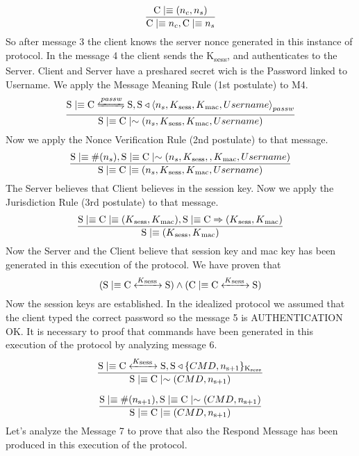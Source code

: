 \[ \frac{\textnormal{C} \mid\equiv (n_c,n_s)}{\textnormal{C} \mid\equiv n_c, \textnormal{C} \mid\equiv n_s} \]
So after message 3 the client knows the server nonce generated in this instance of protocol. In the message 4 the client sends the K\textsubscript{sess}, and authenticates to the Server. Client and Server have a preshared secret wich is the Password linked to Username. We apply the Message Meaning Rule (1st postulate) to M4.
\[ \frac{\textnormal{S} \believes \textnormal{C} \secret{passw} \textnormal{S}, \textnormal{S} \sees \combine{n_s,K\textsubscript{sess},K\textsubscript{mac},Username}{passw}}{\textnormal{S}\believes \textnormal{C} \oncesaid (n_s,K\textsubscript{sess},K\textsubscript{mac},Username)} \]
Now we apply the Nonce Verification Rule (2nd postulate) to that message.
\[ \frac{\textnormal{S}\mid\equiv \#(n_s), \textnormal{S} \mid\equiv \textnormal{C} \mid\sim (n_s,K\textsubscript{sess},,K\textsubscript{mac},Username)}
   {\textnormal{S} \mid\equiv \textnormal{C} \mid\equiv (n_s,K\textsubscript{sess},K\textsubscript{mac},Username)}	\]
The Server believes that Client believes in the session key. Now we apply the Jurisdiction Rule (3rd postulate) to that message.
\[ \frac{\textnormal{S} \mid\equiv \textnormal{C} \mid\equiv (K\textsubscript{sess},K\textsubscript{mac}), \textnormal{S} \mid\equiv \textnormal{C} \Rightarrow (K\textsubscript{sess},K\textsubscript{mac})}
        {\textnormal{S} \mid\equiv (K\textsubscript{sess},K\textsubscript{mac}) } \]
Now the Server and the Client believe that session key and mac key has been generated in this execution of the protocol. We have proven that
\[ (\textnormal{S} \mid\equiv \textnormal{C} \xleftrightarrow{K\textsubscript{sess }} \textnormal{S}) \wedge (\textnormal{C} \mid\equiv \textnormal{C} \xleftrightarrow{K\textsubscript{sess }} \textnormal{S}) \]
Now the session keys are established. In the idealized protocol we assumed that the client typed the correct password so the message 5 is AUTHENTICATION OK. It is necessary to proof that commands have been generated in this execution of the protocol by analyzing message 6.
\[ \frac{\textnormal{S} \mid\equiv \textnormal{C} \xleftrightarrow{K\textsubscript{sess }} \textnormal{S}, \textnormal{S} \triangleleft \lbrace CMD, n\textsubscript{s+1} \rbrace \textsubscript{K\textsubscript{sess}} }{ \textnormal{S} \mid\equiv \textnormal{C} \mid\sim (CMD,n\textsubscript{s+1}) }\]

\[ \frac{ \textnormal{S} \mid\equiv \#(n\textsubscript{s+1}), \textnormal{S} \mid\equiv \textnormal{C} \mid\sim (CMD,n\textsubscript{s+1}) } 
        {\textnormal{S} \mid\equiv \textnormal{C} \mid\equiv (CMD,n\textsubscript{s+1})}\]
Let's analyze the Message 7 to prove that also the Respond Message has been produced in this execution of the protocol.

